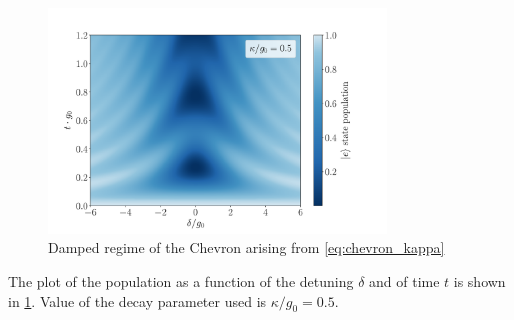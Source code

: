 \begin{figure}
    \centering
    \includegraphics[width = 0.8\textwidth]{Images/Chap3/Chevron_kappa.pdf}
    \caption{Damped regime of the Chevron arising from \cref{eq:chevron_kappa}}
    \label{fig:chevron_kappa}
\end{figure}

The plot of the population as a function of the detuning $\delta$ and of time $t$ is shown in \cref{fig:chevron_kappa}.
Value of the decay parameter used is $\kappa / g_0 = 0.5$.